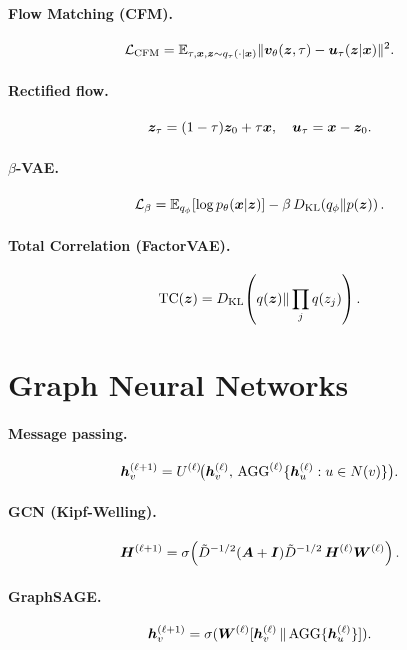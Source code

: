 \paragraph{Flow Matching (CFM).}
\[
\mathcal{L}_{\text{CFM}} = \mathbb{E}_{\tau,\bm{x},\bm{z}\sim q_\tau(\cdot|\bm{x})} \| \bm{v}_\theta(\bm{z}, \tau) - \bm{u}_\tau(\bm{z}|\bm{x})\|^2.
\]

\paragraph{Rectified flow.}
\[
\bm{z}_\tau = (1-\tau)\bm{z}_0 + \tau\bm{x}, \quad \bm{u}_\tau = \bm{x} - \bm{z}_0.
\]

\paragraph{$\beta$-VAE.}
\[
\mathcal{L}_\beta = \mathbb{E}_{q_\phi}[\log p_\theta(\bm{x}|\bm{z})] - \beta\, D_{\mathrm{KL}}\!\left(q_\phi \| p(\bm{z})\right).
\]

\paragraph{Total Correlation (FactorVAE).}
\[
\mathrm{TC}(\bm{z}) = D_{\mathrm{KL}}\!\left(q(\bm{z}) \| \prod_j q(z_j)\right).
\]

\section{Graph Neural Networks}

\paragraph{Message passing.}
\[
\bm{h}_v^{(\ell+1)} = U^{(\ell)}\!\big(\bm{h}_v^{(\ell)},\, \mathrm{AGG}^{(\ell)}\{\bm{h}_u^{(\ell)}: u \in N(v)\}\big).
\]

\paragraph{GCN (Kipf-Welling).}
\[
\bm{H}^{(\ell+1)} = \sigma\!\left(\tilde D^{-1/2}(\bm{A}+\bm{I})\tilde D^{-1/2}\, \bm{H}^{(\ell)} \bm{W}^{(\ell)}\right).
\]

\paragraph{GraphSAGE.}
\[
\bm{h}_v^{(\ell+1)} = \sigma(\bm{W}^{(\ell)}[\bm{h}_v^{(\ell)} \,\|\, \mathrm{AGG}\{\bm{h}_u^{(\ell)}\}]).
\]

